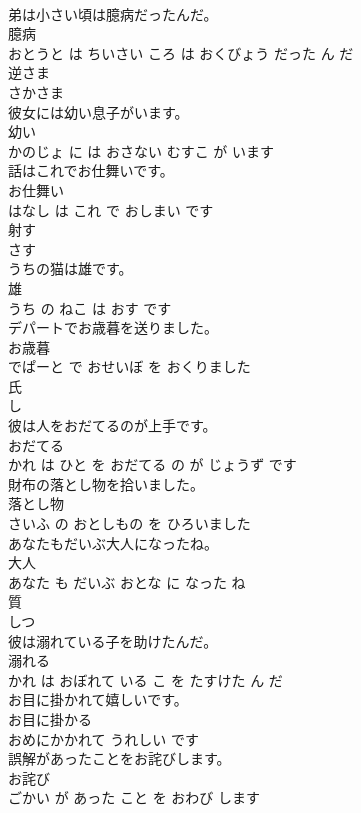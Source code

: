 \documentclass[8pt]{extreport}
\begin{document}
\begin{CJK}{UTF8}{min}
\\	弟は小さい頃は臆病だったんだ。	
\\	臆病 
\\	おとうと は ちいさい ころ は おくびょう だった ん だ			
\\	逆さま	
\\	さかさま		
\\	彼女には幼い息子がいます。	
\\	幼い 
\\	かのじょ に は おさない むすこ が います			
\\	話はこれでお仕舞いです。	
\\	お仕舞い 
\\	はなし は これ で おしまい です			
\\	射す	
\\	さす		
\\	うちの猫は雄です。	
\\	雄 
\\	うち の ねこ は おす です			
\\	デパートでお歳暮を送りました。	
\\	お歳暮 
\\	でぱーと で おせいぼ を おくりました			
\\	氏	
\\	し		
\\	彼は人をおだてるのが上手です。	
\\	おだてる 
\\	かれ は ひと を おだてる の が じょうず です			
\\	財布の落とし物を拾いました。	
\\	落とし物 
\\	さいふ の おとしもの を ひろいました			
\\	あなたもだいぶ大人になったね。	
\\	大人 
\\	あなた も だいぶ おとな に なった ね			
\\	質	
\\	しつ		
\\	彼は溺れている子を助けたんだ。	
\\	溺れる 
\\	かれ は おぼれて いる こ を たすけた ん だ			
\\	お目に掛かれて嬉しいです。	
\\	お目に掛かる 
\\	おめにかかれて うれしい です			
\\	誤解があったことをお詫びします。	
\\	お詫び 
\\	ごかい が あった こと を おわび します			

\end{CJK}
\end{document}
